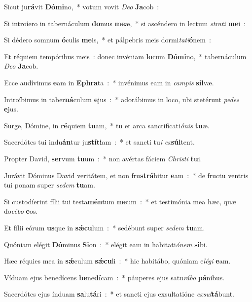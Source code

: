 ﻿\item Sicut ju\textbf{rá}\-vit \textbf{Dó}\-\textbf{mi}\-no,~* votum vovit \emph{De}\-\emph{o} \textbf{Ja}\-cob~:
\item Si introíero in tabernáculum \textbf{do}\-mus \textbf{me}\-æ,~* si ascéndero in lectum \emph{stra}\-\emph{ti} \textbf{me}\-i~:
\item Si dédero somnum \textbf{ó}\-culis \textbf{me}\-is,~* et pálpebris meis dor\-mi\-\emph{ta}\-\emph{ti}\-\textbf{ó}\-nem~:
\item Et réquiem tempóribus meis~: donec invéniam \textbf{lo}\-cum \textbf{Dó}\-\textbf{mi}\-no,~* tabernáculum \emph{De}\-\emph{o} \textbf{Ja}\-cob.
\item Ecce audívimus \textbf{e}\-am in \textbf{E}\-\textbf{phra}\-ta~:~* invénimus eam in \emph{cam}\-\emph{pis} \textbf{sil}\-væ.
\item Introíbimus in taber\textbf{ná}\-culum \textbf{e}\-jus~:~* adorábimus in loco, ubi stetérunt \emph{pe}\-\emph{des} \textbf{e}\-jus.
\item Surge, Dómine, in \textbf{ré}\-quiem \textbf{tu}\-am,~* tu et arca sanctificati\emph{ó}\-\emph{nis} \textbf{tu}\-æ.
\item Sacerdótes tui indu\textbf{án}\-tur ju\textbf{stí}\-\textbf{ti}\-am~:~* et sancti tu\emph{i} \emph{ex}\-\textbf{súl}\-tent.
\item Propter David, \textbf{ser}\-vum \textbf{tu}\-um~:~* non avértas fáciem \emph{Chri}\-\emph{sti} \textbf{tu}\-i.
\item Jurávit Dóminus David veritátem, et non fru\textbf{strá}\-bitur \textbf{e}\-am~:~* de fructu ventris tui ponam super \emph{se}\-\emph{dem} \textbf{tu}\-am.
\item Si custodíerint fílii tui testa\textbf{mén}\-tum \textbf{me}\-um~:~* et testimónia mea hæc, quæ do\emph{cé}\-\emph{bo} \textbf{e}\-os.
\item Et fílii eórum \textbf{us}\-que in \textbf{sǽ}\-\textbf{cu}\-lum~:~* sedébunt super \emph{se}\-\emph{dem} \textbf{tu}\-am.
\item Quóniam elégit \textbf{Dó}\-minus \textbf{Si}\-on~:~* elégit eam in ha\-bi\-ta\-ti\-\emph{ó}\-\emph{nem} \textbf{si}\-bi.
\item Hæc réquies mea in \textbf{sǽ}\-culum \textbf{sǽ}\-\textbf{cu}\-li~:~* hic habitábo, quóniam e\emph{lé}\-\emph{gi} \textbf{e}\-am.
\item Víduam ejus benedícens \textbf{be}\-ne\textbf{dí}\-cam~:~* páuperes ejus sa\-tu\-\emph{rá}\-\emph{bo} \textbf{pá}\-nibus.
\item Sacerdótes ejus índuam \textbf{sa}\-lu\textbf{tá}\-ri~:~* et sancti ejus exsultatióne \emph{ex}\-\emph{sul}\-\textbf{tá}\-bunt.
